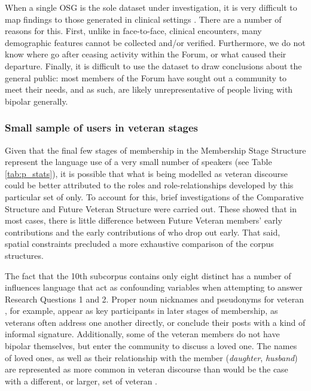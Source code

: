 When a single \gls{OSG} is the sole dataset under investigation, it is very difficult to map findings to those generated in clinical settings \textcite{maclean_forum77:_2015}. There are a number of reasons for this. First, unlike in face\hyp{}to\hyp{}face, clinical encounters, many demographic features cannot be collected and\slash or verified. Furthermore, we do not know where  go after ceasing activity within the \gls{Forum}, or what caused their departure. Finally, it is difficult to use the dataset to draw conclusions about the general public: most \glspl{member} of the \gls{Forum} have sought out a community to meet their needs, and as such, are likely unrepresentative of people living with \gls{bipolar} generally. %


\subsubsection*{Small sample of users in veteran stages}

Given that the final few stages of membership in the Membership Stage Structure represent the language use of a very small number of speakers (see Table \ref{tab:p_stats}), it is possible that what is being modelled as veteran  discourse could be better attributed to the roles and role\hyp{}relationships developed by this particular set of  only. To account for this, brief investigations of the Comparative Structure and Future Veteran Structure were carried out. These showed that in most cases, there is little difference between Future Veteran members' early contributions and the early contributions of  who drop out early. That said, spatial constraints precluded a more exhaustive comparison of the corpus structures.

The fact that the 10th subcorpus contains only eight distinct  has a number of influences language that act as confounding variables when attempting to answer Research Questions 1 and 2. Proper noun nicknames and pseudonyms for veteran , for example, appear as key participants in later stages of membership, as veterans often address one another directly, or conclude their \glspl{post} with a kind of informal signature. Additionally, some of the veteran \glspl{member} do not have \gls{bipolar} themselves, but enter the community to discuss a loved one. The names of loved ones, as well as their relationship with the member (\emph{daughter}, \emph{husband}) are represented as more common in veteran discourse than would be the case with a different, or larger, set of veteran .

